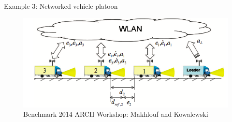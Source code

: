 \begin{frame}{Example 3: Networked vehicle platoon}

\begin{figure}
\caption*{\small {\color{blue} Benchmark 2014 ARCH Workshop: Makhlouf and Kowalewski~\cite{makhlouf2014networked}}}
\includegraphics[scale=0.5]{fig/VehiclePlatoon.png}
\end{figure}
\end{frame}




















